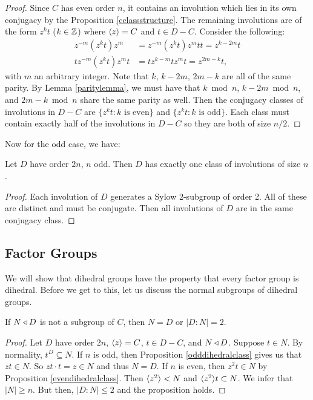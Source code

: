 \documentclass[main.tex]{subfiles}
\begin{document}
\begin{proof}
Since $C$ has even order $n$, it contains an involution which lies in its own conjugacy by the Proposition \ref{cclassstructure}. The remaining involutions are of the form $z^k t$ ($k \in \mathbb{Z}$) where $\langle z \rangle = C$ and $t \in D - C$. Consider the following:
\begin{align*}
z^{-m} (z^k t) z^m &= z^{-m} (z^k t) z^m t t = z^{k-2m} t \\
t z^{-m} (z^k t) z^m t &= t z^{k-m} t z^m t= z^{2m-k} t \text{,}
\end{align*}
with $m$ an arbitrary integer. Note that $k$, $k-2m$, $2m-k$ are all of the same parity. By Lemma \ref{paritylemma}, we must have that $k \bmod n$, $k-2m \bmod n$, and $2m-k \bmod n$ share the same parity as well. Then the conjugacy classes of involutions in $D - C$ are $\{z^k t : k \text{ is even}\}$ and $\{z^k t : k \text{ is odd}\}$. Each class must contain exactly half of the involutions in $D - C$ so they are both of size $n/2$.
\end{proof}

Now for the odd case, we have:

\begin{proposition}\label{odddihedralclass}
Let $D$ have order $2n$, $n$ odd. Then $D$ has exactly one class of involutions of size $n$.
\end{proposition}

\begin{proof}
Each involution of $D$ generates a Sylow 2-subgroup of order 2. All of these are distinct and must be conjugate. Then all involutions of $D$ are in the same conjugacy class.
\end{proof}


\subsection{Factor Groups}

We will show that dihedral groups have the property that every factor group is dihedral. Before we get to this, let us discuss the normal subgroups of dihedral groups.

\begin{proposition}
If $N \triangleleft D$ is not a subgroup of $C$, then $N = D$ or $|D : N| = 2$.
\end{proposition}

\begin{proof}
Let $D$ have order $2n$, $\langle z \rangle = C$, $t \in D - C$, and $N \triangleleft D$. Suppose $t \in N$. By normality, $t^D \subseteq N$. If $n$ is odd, then Proposition \ref{odddihedralclass} gives us that $z t \in N$. So $z t \cdot t = z \in N$ and thus $N = D$. If $n$ is even, then $z^2 t \in N$ by Proposition \ref{evendihedralclass}. Then $\langle z^2 \rangle < N$ and $\langle z^2 \rangle t \subset N$. We infer that $|N| \ge n$. But then, $|D : N| \le 2$ and the proposition holds.
\end{proof}
\end{document}

